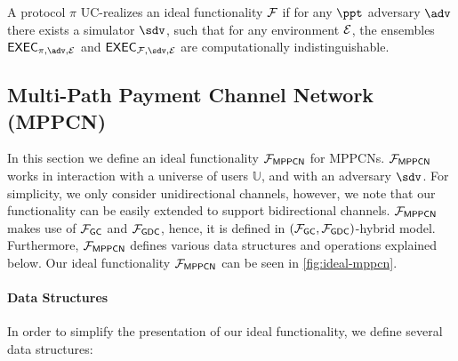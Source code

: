 \begin{definition}
A protocol $\pi$ UC-realizes an ideal functionality $\mathcal{F}$ if for any $\ppt$ adversary 
$\adv$ there exists a simulator $\sdv$, such that for any environment $\mathcal{E}$, the 
ensembles $\exec_{\pi, \adv, \dist}$ and $\exec_{\FF, \sdv, \dist}$ are computationally 
indistinguishable.
\end{definition}

\subsection{Multi-Path Payment Channel Network (MPPCN)}
\label{sec:mppcn}

In this section we define an ideal functionality $\mathcal{F}_{\mathsf{MPPCN}}$ for MPPCNs. 
$\mathcal{F}_{\mathsf{MPPCN}}$ works in interaction with a universe of users $\mathbb{U}$, and with an 
adversary $\sdv$. For simplicity, we only consider unidirectional channels, however, we note 
that our functionality can be easily extended to support bidirectional channels. 
$\mathcal{F}_{\mathsf{MPPCN}}$ makes use of $\mathcal{F}_{\mathsf{GC}}$ and $\mathcal{F}_{\mathsf{GDC}}$, 
hence, it is defined in $(\mathcal{F}_{\mathsf{GC}}, \mathcal{F}_{\mathsf{GDC}})$-hybrid model. Furthermore, 
$\mathcal{F}_{\mathsf{MPPCN}}$ defines various data structures and operations explained below. 
Our ideal functionality $\mathcal{F}_{\mathsf{MPPCN}}$ can be seen in \cref{fig:ideal-mppcn}.

\paragraph{Data Structures} 
In order to simplify the presentation of our ideal functionality, we define several data 
structures:

